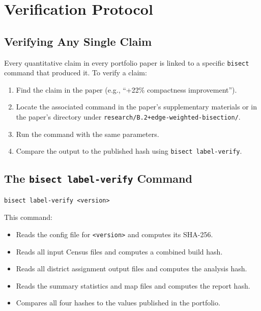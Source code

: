 
\section{Verification Protocol}
\label{sec:verification}

\subsection*{Verifying Any Single Claim}

Every quantitative claim in every portfolio paper is linked to a specific
\texttt{bisect} command that produced it.
To verify a claim:

\begin{enumerate}[leftmargin=*, itemsep=4pt]
  \item Find the claim in the paper (e.g., ``+22\% compactness improvement'').
  \item Locate the associated command in the paper's supplementary materials
        or in the paper's directory under \texttt{research/B.2+edge-weighted-bisection/}.
  \item Run the command with the same parameters.
  \item Compare the output to the published hash using \texttt{bisect label-verify}.
\end{enumerate}

\subsection*{The \texttt{bisect label-verify} Command}

\begin{verbatim}
bisect label-verify <version>
\end{verbatim}

\noindent This command:
\begin{itemize}[itemsep=2pt]
  \item Reads the config file for \texttt{<version>} and computes its SHA-256.
  \item Reads all input Census files and computes a combined build hash.
  \item Reads all district assignment output files and computes the analysis hash.
  \item Reads the summary statistics and map files and computes the report hash.
  \item Compares all four hashes to the values published in the portfolio.
\end{itemize}

